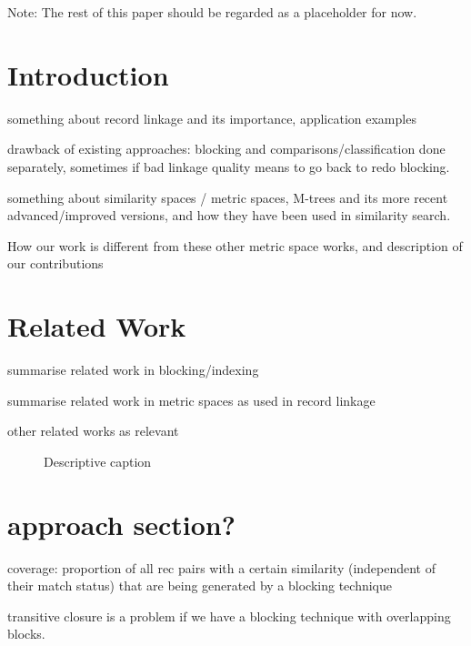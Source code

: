 \documentclass{llncs}
\begin{document}
Note: The rest of this paper should be regarded as a placeholder for now.

\section{Introduction}
\label{sec-intro}

something about record linkage and its importance, application examples

drawback of existing approaches: blocking and comparisons/classification
done separately, sometimes if bad linkage quality means to go back to redo
blocking.

something about similarity spaces / metric spaces, M-trees and its
more recent advanced/improved versions, and how they have been used in
similarity search.

How our work is different from these other metric space works, and
description of our contributions


\section{Related Work}
\label{sec-related}

summarise related work in blocking/indexing

summarise related work in metric spaces as used in record linkage

other related works as relevant


\begin{figure}[t]
  \centering
  \caption{Descriptive caption
           \label{fig:xyz}}
\end{figure}

\section{approach section?}
\label{sec-overview}

coverage: proportion of all rec pairs with a certain similarity
(independent of their match status) that are being generated by
a blocking  technique

transitive closure is a problem if we have a blocking technique with overlapping blocks.
\end{document}
